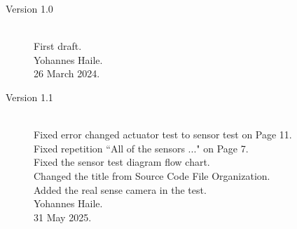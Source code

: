 \documentclass{CSSRforAfrica}
\begin{document}
\begin{description}

\item [Version 1.0]~\\
First draft. \\
Yohannes Haile. \\                                     %
26 March 2024.                                         %

\item [Version 1.1]~\\
Fixed error changed actuator test to sensor test on Page 11.\\
Fixed repetition ``All of the sensors ..." on Page 7.\\
Fixed the sensor test diagram flow chart.\\	
Changed the title from Source Code \textrightarrow{} File Organization.\\
Added the real sense camera in the test.\\
Yohannes Haile. \\                                     %
31 May 2025.                                         %


\end{description}
\end{document}
